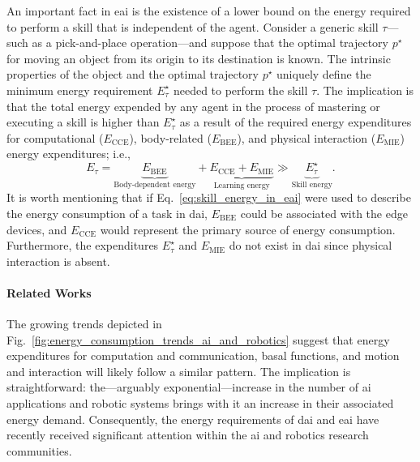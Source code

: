 \documentclass[12pt]{article}
\begin{document}
An important fact in \ac{eai} is the existence of a lower bound on the energy required to perform a skill that is independent of the agent. Consider a generic skill $\tau$---such as a pick-and-place operation---and suppose that the optimal trajectory $p^\star$ for moving an object from its origin to its destination is known. The intrinsic properties of the object and the optimal trajectory $p^\star$ uniquely define the minimum energy requirement $E^\star_{\tau}$ needed to perform the skill $\tau$. The implication is that the total energy expended by any agent in the process of mastering or executing a skill is higher than $E^\star_{\tau}$ as a result of the required energy expenditures for computational ($E_\text{CCE}$), body-related ($E_\text{BEE}$), and physical interaction ($E_\text{MIE}$) energy expenditures; i.e.,
\begin{equation}\label{eq:skill_energy_in_eai}
	E_{\tau} =  \underbrace{E_\text{BEE}}_{\text{Body-dependent energy}} + \underbrace{E_\text{CCE} + E_\text{MIE}}_{\text{Learning energy}} \gg \underbrace{E^\star_{\tau}}_{\text{Skill energy}} .
\end{equation}
It is worth mentioning that if Eq.~\eqref{eq:skill_energy_in_eai} were used to describe the energy consumption of a task in \ac{dai}, $E_\text{BEE}$ could be associated with the edge devices, and $E_\text{CCE}$ would represent the primary source of energy consumption. Furthermore, the expenditures $E^\star_{\tau}$ and $E_\text{MIE}$ do not exist in \ac{dai} since physical interaction is absent.

\paragraph*{Related Works} The growing trends depicted in Fig.~\ref{fig:energy_consumption_trends_ai_and_robotics} suggest that energy expenditures for computation and communication, basal functions, and motion and interaction will likely follow a similar pattern. The implication is straightforward: the---arguably exponential---increase in the number of \ac{ai} applications and robotic systems brings with it an increase in their associated energy demand. Consequently, the energy requirements of \ac{dai} and \ac{eai} have recently received significant attention within the \ac{ai} and robotics research communities.
\end{document}
